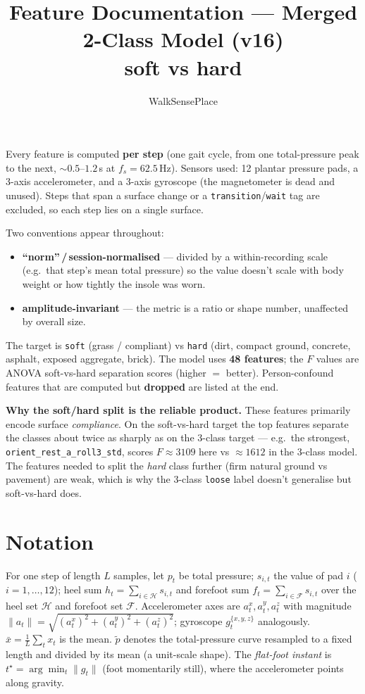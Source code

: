 \documentclass[11pt]{article}
\title{\textbf{Feature Documentation — Merged 2-Class Model (v16)}\\[2pt]
\large soft vs hard}
\author{WalkSensePlace}
\date{}
\newcommand{\code}[1]{\texttt{#1}}
\begin{document}
\maketitle

Every feature is computed \textbf{per step} (one gait cycle, from one total-pressure peak to the
next, ${\sim}0.5$–$1.2$\,s at $f_s=62.5$\,Hz). Sensors used: 12 plantar pressure pads, a 3-axis
accelerometer, and a 3-axis gyroscope (the magnetometer is dead and unused). Steps that span a
surface change or a \code{transition}/\code{wait} tag are excluded, so each step lies on a single
surface.

Two conventions appear throughout:
\begin{itemize}
  \item \textbf{``norm''\,/\,session-normalised} --- divided by a within-recording scale (e.g.\ that
  step's mean total pressure) so the value doesn't scale with body weight or how tightly the insole
  was worn.
  \item \textbf{amplitude-invariant} --- the metric is a ratio or shape number, unaffected by
  overall size.
\end{itemize}

The target is \code{soft} (grass / compliant) vs \code{hard} (dirt, compact ground, concrete,
asphalt, exposed aggregate, brick). The model uses \textbf{48 features}; the $F$ values are ANOVA
soft-vs-hard separation scores (higher $=$ better). Person-confound features that are computed but
\textbf{dropped} are listed at the end.

\medskip\noindent\textbf{Why the soft/hard split is the reliable product.} These features primarily
encode surface \emph{compliance}. On the soft-vs-hard target the top features separate the classes
about twice as sharply as on the 3-class target --- e.g.\ the strongest,
\code{orient_rest_a_roll3_std}, scores $F\approx3109$ here vs $\approx1612$ in the 3-class model.
The features needed to split the \emph{hard} class further (firm natural ground vs pavement) are
weak, which is why the 3-class \code{loose} label doesn't generalise but soft-vs-hard does.

\section*{Notation}
For one step of length $L$ samples, let $p_t$ be total pressure; $s_{i,t}$ the value of pad $i$
($i=1,\dots,12$); heel sum $h_t=\sum_{i\in\mathcal H}s_{i,t}$ and forefoot sum
$f_t=\sum_{i\in\mathcal F}s_{i,t}$ over the heel set $\mathcal H$ and forefoot set $\mathcal F$.
Accelerometer axes are $a^x_t,a^y_t,a^z_t$ with magnitude
$\lVert a_t\rVert=\sqrt{(a^x_t)^2+(a^y_t)^2+(a^z_t)^2}$; gyroscope $g^{\{x,y,z\}}_t$ analogously.
$\bar x=\tfrac1L\sum_t x_t$ is the mean. $\tilde p$ denotes the total-pressure curve resampled to a
fixed length and divided by its mean (a unit-scale shape). The \emph{flat-foot instant} is
$t^\star=\arg\min_t \lVert g_t\rVert$ (foot momentarily still), where the accelerometer points along
gravity.
\end{document}
